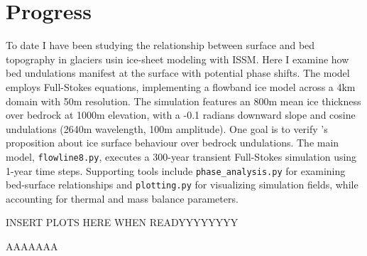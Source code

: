 \chapter{Progress}

To date I have been studying the relationship between surface and bed topography in glaciers usin ice-sheet modeling with ISSM. Here I examine how bed undulations manifest at the surface with potential phase shifts. The model employs Full-Stokes equations, implementing a flowband ice model across a 4km domain with 50m resolution. The simulation features an 800m mean ice thickness over bedrock at 1000m elevation, with a -0.1 radians downward slope and cosine undulations (2640m wavelength, 100m amplitude). One goal is to verify \cite{Budd_1970}'s proposition about ice surface behaviour over bedrock undulations. The main model, \texttt{flowline8.py}, executes a 300-year transient Full-Stokes simulation using 1-year time steps. Supporting tools include \texttt{phase\_analysis.py} for examining bed-surface relationships and \texttt{plotting.py} for visualizing simulation fields, while accounting for thermal and mass balance parameters.

\vspace{6cm}
INSERT PLOTS HERE WHEN READYYYYYYYY

AAAAAAA